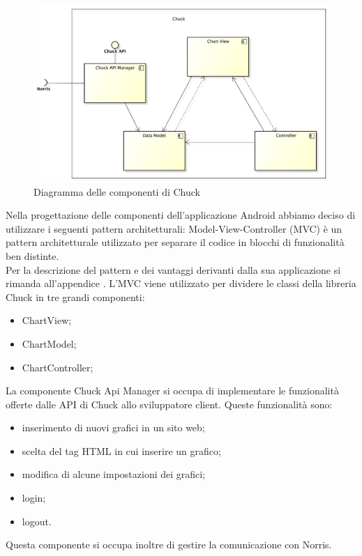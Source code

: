 	\begin{figure}[H]\centering
        \includegraphics[width=\textwidth]{SpecificaTecnica/Pics/ComponentiChuck}
        \caption{Diagramma delle componenti di Chuck}
    \end{figure}
		Nella progettazione delle componenti dell'applicazione Android abbiamo deciso di utilizzare i seguenti pattern architetturali:
			Model-View-Controller (MVC) è un pattern architetturale utilizzato per separare il codice in blocchi di funzionalità ben distinte.\\
			Per la descrizione del pattern e dei vantaggi derivanti dalla sua applicazione si rimanda all'appendice .
				L'MVC viene utilizzato per dividere le classi della libreria Chuck in tre grandi componenti:
				\begin{itemize}
					\item ChartView;
					\item ChartModel;
					\item ChartController;
				\end{itemize}
    		La componente Chuck Api Manager si occupa di implementare le funzionalità offerte dalle API di Chuck allo sviluppatore client. Queste funzionalità sono:
    		\begin{itemize}
				\item inserimento di nuovi grafici in un sito web;
				\item scelta del tag HTML in cui inserire un grafico;
				\item modifica di alcune impostazioni dei grafici;
				\item login;
				\item logout.
			\end{itemize}
    		Questa componente si occupa inoltre di gestire la comunicazione con Norris.
		
